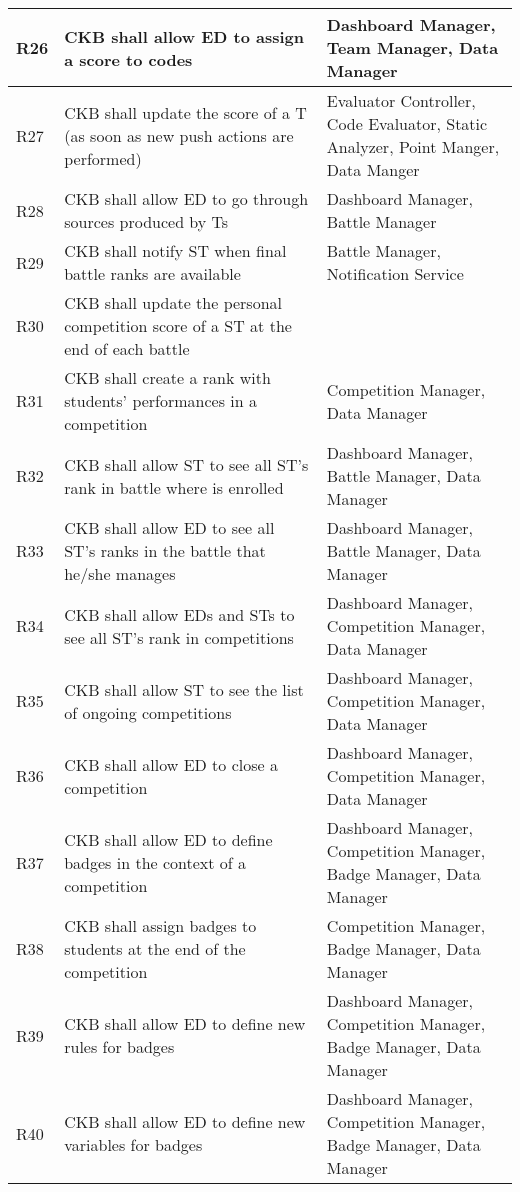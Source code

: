 \begin{center}
\begin{longtable}{|p{0.05\linewidth}|p{0.55\linewidth}|p{0.4\linewidth}|}
        R26 & CKB shall allow ED to assign a score to codes & Dashboard Manager, Team Manager, Data Manager \\
        \hline
        R27 & CKB shall update the score of a T (as soon as new push actions are performed) & Evaluator Controller, Code Evaluator, Static Analyzer, Point Manger, Data Manger\\
        \hline
        R28 & CKB shall allow ED to go through sources produced by Ts & Dashboard Manager, Battle Manager\\
        \hline
        R29 & CKB shall notify ST when final battle ranks are available & Battle Manager, Notification Service \\
        \hline
        R30 & CKB shall update the personal competition score of a ST at the end of each battle &\\
        \hline
        R31 & CKB shall create a rank with students' performances in a competition & Competition Manager, Data Manager \\
        \hline
        R32 & CKB shall allow ST to see all ST’s rank in battle where is enrolled & Dashboard Manager, Battle Manager,  Data Manager \\
        \hline
        R33 & CKB shall allow ED to see all ST’s ranks in the battle that he/she manages & Dashboard Manager, Battle Manager, Data Manager\\
        \hline
        R34 & CKB shall allow EDs and STs to see all ST’s rank in competitions & Dashboard Manager, Competition Manager, Data Manager \\
        \hline
        R35 & CKB shall allow ST to see the list of ongoing competitions & Dashboard Manager, Competition Manager, Data Manager\\
        \hline
        R36 & CKB shall allow ED to close a competition &  Dashboard Manager, Competition Manager, Data Manager\\
        \hline
        R37 & CKB shall allow ED to define badges in the context of a competition & Dashboard Manager, Competition Manager, Badge Manager, Data Manager \\
        \hline
        R38 & CKB shall assign badges to students at the end of the competition & Competition Manager, Badge Manager, Data Manager \\
        \hline
        R39 & CKB shall allow ED to define new rules for badges & Dashboard Manager, Competition Manager, Badge Manager, Data Manager \\
        \hline
        R40 & CKB shall allow ED to define new variables for badges & Dashboard Manager, Competition Manager, Badge Manager, Data Manager\\

\end{longtable}
\end{center}
